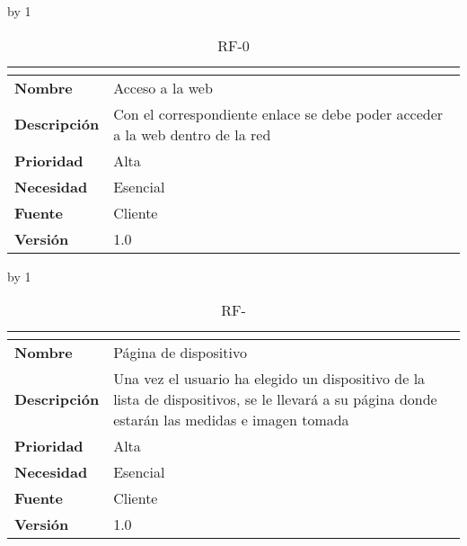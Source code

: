 \advance\rf by 1
\begin{table}[H]
	\caption{RF-0\number\rf}
	\begin{tabular}{|l|p{}|}
		\hline
		\multicolumn{2}{|c|}{\cellcolor[HTML]{BFBFBF}{\color[HTML]{000000} \textbf{RF-0\number\rf}}} \\ \hline
		\textbf{Nombre}      & Acceso a la web                                                               \\ \hline
		\textbf{Descripción} & Con el correspondiente enlace se debe poder acceder a la web dentro de la red \\ \hline
		\textbf{Prioridad}   & Alta                                                                          \\ \hline
		\textbf{Necesidad}   & Esencial                                                                      \\ \hline
		\textbf{Fuente}      & Cliente                                                                       \\ \hline
		\textbf{Versión}     & 1.0                                                                           \\ \hline
	\end{tabular}
\end{table}
\advance\rf by 1
\begin{table}[H]
	\caption{RF-\number\rf}
	\begin{tabular}{|l|p{}|}
		\hline
		\multicolumn{2}{|c|}{\cellcolor[HTML]{BFBFBF}{\color[HTML]{000000} \textbf{RF-\number\rf}}} \\ \hline
		\textbf{Nombre}      & Página de dispositivo                                                                                                                         \\ \hline
		\textbf{Descripción} & Una vez el usuario ha elegido un dispositivo de la lista de dispositivos, se le llevará a su página donde estarán las medidas e imagen tomada \\ \hline
		\textbf{Prioridad}   & Alta                                                                                                                                          \\ \hline
		\textbf{Necesidad}   & Esencial                                                                                                                                      \\ \hline
		\textbf{Fuente}      & Cliente                                                                                                                                       \\ \hline
		\textbf{Versión}     & 1.0                                                                                                                                           \\ \hline
	\end{tabular}
\end{table}
